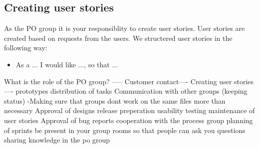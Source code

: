 \subsection{Creating user stories}
As the PO group it is your responsiblity to create user stories.
User stories are created based on requests from the users.
We structered user stories in the following way:
\begin{itemize}
    \item As a ... I would like ..., so that ...
\end{itemize}



What is the role of the PO group? -----
Customer contact----
Creating user stories ----
prototypes
distribution of tasks
Communication with other groups (keeping status)
-Making sure that groups dont work on the same files more than necessary
Approval of designs
release preperation
usability testing
maintenance of user stories
Approval of bug reports
cooperation with the process group
planning of sprints
be present in your group rooms so that people can ask you questions
sharing knowledge in the po group










